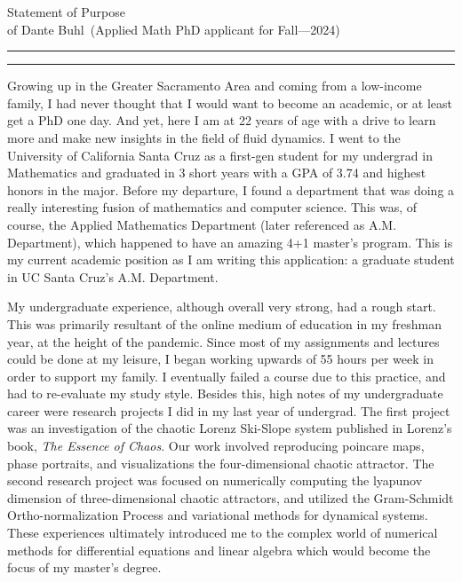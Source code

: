 \documentclass{article}
\newcommand{\soptitle}{Statement of Purpose}
\newcommand{\yourname}{Dante Buhl}
\begin{document}
\begin{center}\LARGE\soptitle\\
\large of \yourname\ (Applied Math PhD applicant for Fall---2024)
\end{center}

\hrule
\vspace{1pt}
\hrule height 1pt

\bigskip

\large
Growing up in the Greater Sacramento Area and coming from a low-income family, I had never thought that I would want to become an academic, or at least get a PhD one day. And yet, here I am at 22 years of age with a drive to learn more and make new insights in the field of fluid dynamics. I went to the University of California Santa Cruz as a first-gen student for my undergrad in Mathematics and graduated in 3 short years with a GPA of 3.74 and highest honors in the major. Before my departure, I found a department that was doing a really interesting fusion of mathematics and computer science. This was, of course, the Applied Mathematics Department (later referenced as A.M. Department), which happened to have an amazing 4+1 master's program. This is my current academic position as I am writing this application: a graduate student in UC Santa Cruz's A.M. Department. 

My undergraduate experience, although overall very strong, had a rough start. This was primarily resultant of the online medium of education in my freshman year, at the height of the pandemic. Since most of my assignments and lectures could be done at my leisure, I began working upwards of 55 hours per week in order to support my family. I eventually failed a course due to this practice, and had to re-evaluate my study style. Besides this, high notes of my undergraduate career were research projects I did in my last year of undergrad. The first project was an investigation of the chaotic Lorenz Ski-Slope system published in Lorenz's book, \textit{The Essence of Chaos}. Our work involved reproducing poincare maps, phase portraits, and visualizations the four-dimensional chaotic attractor. The second research project was focused on numerically computing the lyapunov dimension of three-dimensional chaotic attractors, and utilized the Gram-Schmidt Ortho-normalization Process and variational methods for dynamical systems. These experiences ultimately introduced me to the complex world of numerical methods for differential equations and linear algebra which would become the focus of my master's degree. 
\end{document}
